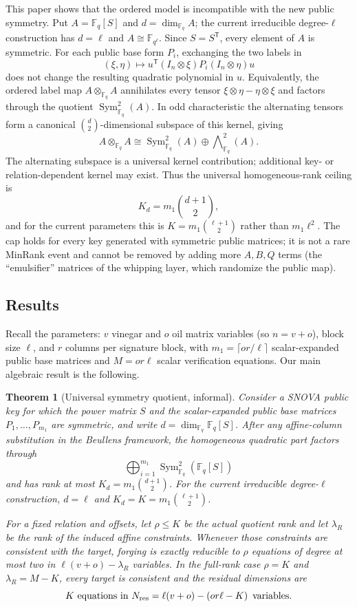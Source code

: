 \documentclass[11pt]{article}
\newtheorem{theorem}{Theorem}
\newcommand{\F}{\mathbb F}
\newcommand{\Sym}{\operatorname{Sym}}
\newcommand{\transpose}{\mathsf T}
\newcommand{\SNOVA}{\textsf{SNOVA}}
\begin{document}
This paper shows that the ordered model is incompatible with the new public symmetry.  Put $A=\F_q[S]$ and $d=\dim_{\F_q}A$; the current irreducible degree-$\ell$ construction has $d=\ell$ and $A\cong\F_{q^\ell}$.  Since $S=S^\transpose$, every element of $A$ is symmetric.  For each public base form $P_i$, exchanging the two labels in
\[
 (\xi,\eta)\longmapsto
 u^\transpose(I_n\otimes\xi)P_i(I_n\otimes\eta)u
\]
does not change the resulting quadratic polynomial in $u$.  Equivalently, the ordered label map $A\otimes_{\F_q}A$ annihilates every tensor $\xi\otimes\eta-\eta\otimes\xi$ and factors through the quotient $\Sym^2_{\F_q}(A)$.  In odd characteristic the alternating tensors form a canonical $\binom d2$-dimensional subspace of this kernel, giving
\[
 A\otimes_{\F_q}A
 \cong \Sym^2_{\F_q}(A)\oplus\bigwedge\nolimits^2_{\F_q}(A).
\]
The alternating subspace is a universal kernel contribution; additional key- or relation-dependent kernel may exist.  Thus the universal homogeneous-rank ceiling is
\[
 K_d=m_1\binom{d+1}{2},
\]
and for the current parameters this is $K=m_1\binom{\ell+1}{2}$ rather than $m_1\ell^2$.  The cap holds for every key generated with symmetric public matrices; it is not a rare MinRank event and cannot be removed by adding more $A,B,Q$ terms (the ``emulsifier'' matrices of the whipping layer, which randomize the public map).

\subsection{Results}

Recall the parameters: $v$ vinegar and $o$ oil matrix variables (so $n=v+o$), block size $\ell$, and $r$ columns per signature block, with $m_1=\lceil or/\ell\rceil$ scalar-expanded public base matrices and $M=or\ell$ scalar verification equations.  Our main algebraic result is the following.

\begin{theorem}[Universal symmetry quotient, informal]\label{thm:intro}
Consider a \SNOVA{} public key for which the power matrix $S$ and the scalar-expanded public base matrices $P_1,\ldots,P_{m_1}$ are symmetric, and write $d=\dim_{\F_q}\F_q[S]$.  After any affine-column substitution in the Beullens framework, the homogeneous quadratic part factors through
\[
 \bigoplus_{i=1}^{m_1}\Sym^2_{\F_q}(\F_q[S])
\]
and has rank at most $K_d=m_1\binom{d+1}{2}$.  For the current irreducible degree-$\ell$ construction, $d=\ell$ and $K_d=K=m_1\binom{\ell+1}{2}$.

For a fixed relation and offsets, let $\rho\le K$ be the actual quotient rank and let $\lambda_R$ be the rank of the induced affine constraints.  Whenever those constraints are consistent with the target, forging is exactly reducible to $\rho$ equations of degree at most two in $\ell(v+o)-\lambda_R$ variables.  In the full-rank case $\rho=K$ and $\lambda_R=M-K$, every target is consistent and the residual dimensions are
\[
 K\text{ equations in }N_{\rm res}=\ell(v+o)-\left(or\ell-K\right)\text{ variables}.
\]
\end{theorem}
\end{document}
